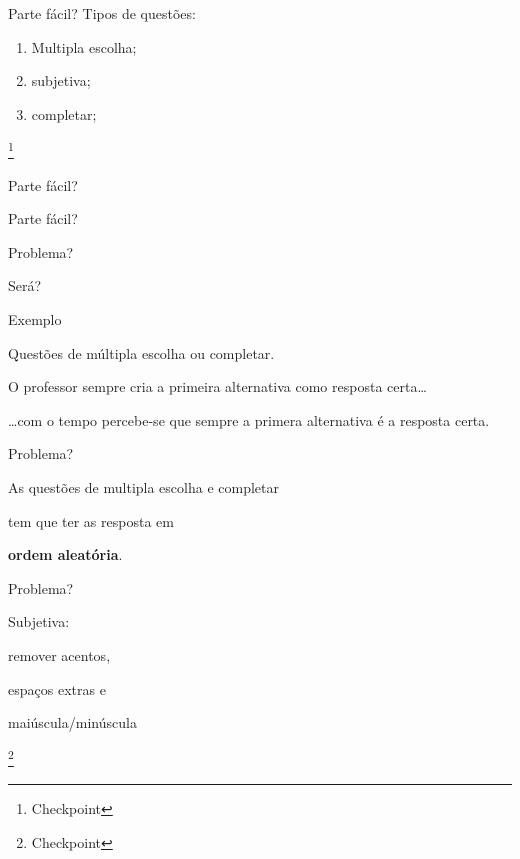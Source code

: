 \documentclass[xcolor=dvipsnames]{beamer}
\begin{document}
  \begin{frame}{Parte fácil?}
      \Huge Tipos de questões:

      \begin{enumerate}
        \item Multipla escolha;
        \item subjetiva;
        \item completar;
      \end{enumerate}

      \let\thefootnote\relax\footnote{Checkpoint}
  \end{frame}

  \begin{frame}{Parte fácil?}
    \begin{center}
      \Large Parte fácil?

      \Huge Problema?

      \Large Será?
    \end{center}
  \end{frame}

  \begin{frame}{Exemplo}
    \begin{center}
      \large Questões de múltipla escolha ou completar.
    \end{center}

    \pause

    \huge O professor sempre cria a primeira alternativa como resposta certa\ldots

    \pause

    \begin{center}
      \Huge \ldots com o tempo percebe-se que sempre a primera alternativa é
      a resposta certa.
    \end{center}
  \end{frame}

  \begin{frame}{Problema?}
    \begin{center}
      \huge As questões de {\Huge multipla escolha} e {\Huge completar}

      tem que ter as resposta em

      \textbf{ordem aleatória}.
    \end{center}
  \end{frame}

  \begin{frame}{Problema?}

      \Huge Subjetiva:

      \vspace{1cm}

      \LARGE

      remover acentos,

      espaços extras e

      maiúscula/minúscula

      \let\thefootnote\relax\footnote{Checkpoint}
  \end{frame}
\end{document}
